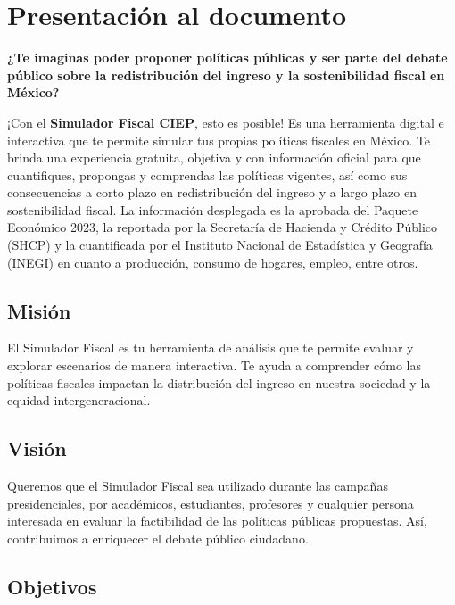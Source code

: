 \ifdefined\maindoc\else

\fi

\chapter{\textbf{Presentación} al documento}

\textbf{¿Te imaginas poder proponer políticas públicas y ser parte del debate público sobre la redistribución del ingreso y la sostenibilidad fiscal en México?}

¡Con el \textbf{Simulador Fiscal \acs{CIEP}}, esto es posible! Es una herramienta digital e interactiva que te permite simular tus propias políticas fiscales en México. Te brinda una experiencia gratuita, objetiva y con información oficial para que cuantifiques, propongas y comprendas las políticas vigentes, así como sus consecuencias a corto plazo en redistribución del ingreso y a largo plazo en sostenibilidad fiscal. La información desplegada es la aprobada del Paquete Económico 2023, la reportada por la Secretaría de Hacienda y Crédito Público (SHCP) y la cuantificada por el Instituto Nacional de Estadística y Geografía (INEGI) en cuanto a producción, consumo de hogares, empleo, entre otros.

\section{Misión}

El Simulador Fiscal es tu herramienta de análisis que te permite evaluar y explorar escenarios de manera interactiva. Te ayuda a comprender cómo las políticas fiscales impactan la distribución del ingreso en nuestra sociedad y la equidad intergeneracional.

\section{Visión}

Queremos que el Simulador Fiscal sea utilizado durante las campañas presidenciales, por académicos, estudiantes, profesores y cualquier persona interesada en evaluar la factibilidad de las políticas públicas propuestas. Así, contribuimos a enriquecer el debate público ciudadano.

\section{Objetivos}


